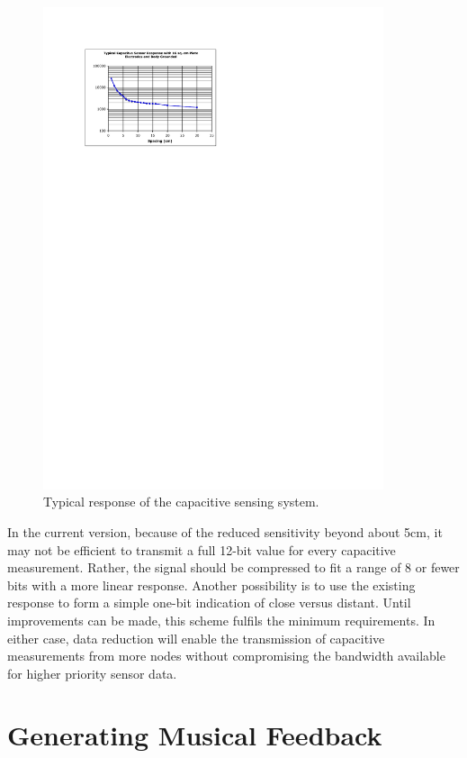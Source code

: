 \begin{figure}[t]
\centering
\includegraphics[width=100mm]{jp_fig8} 
\caption{Typical response of the capacitive sensing system.}
\label{Aylward:fig:8} 
\end{figure}

In the current version, because of the reduced sensitivity beyond about 5cm, it
may not be efficient to transmit a full 12-bit value for every capacitive
measurement. Rather, the signal should be compressed to fit a range of 8 or fewer
bits with a more linear response. Another possibility is to use the existing
response to form a simple one-bit indication of close versus distant. Until
improvements can be made, this scheme fulfils the minimum requirements. In
either case, data reduction will enable the transmission of capacitive
measurements from more nodes without compromising the bandwidth available for
higher priority sensor data.

\section{Generating Musical Feedback}


